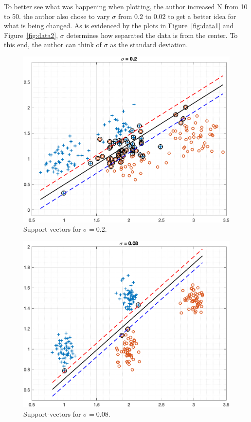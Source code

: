 \documentclass[journal]{IEEEtran}
\begin{document}
To better see what was happening when plotting, the author increased N from 10 to 50. the author also chose to vary \( \sigma \) from 0.2 to 0.02 to get a better idea for what is being changed. As is evidenced by the plots in Figure~\ref{fig:data1} and Figure~\ref{fig:data2}, \( \sigma \) determines how separated the data is from the center. To this end, the author can think of \( \sigma \) as the standard deviation.

\begin{figure}[ht]
    \centering
    \includegraphics[width=\linewidth]{figure02.png}
    \caption{Support-vectors for \( \sigma = 0.2\).}
    \label{fig:SVM-0.2}
\end{figure}

\begin{figure}[ht]
    \centering
    \includegraphics[width=\linewidth]{figure03.png}
    \caption{Support-vectors for \( \sigma = 0.08\).}
    \label{fig:SVM-0.08}
\end{figure}
\end{document}
